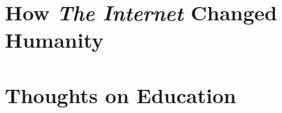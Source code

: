 \newpage


\toclineskip
\section{How \textit{The Internet} Changed Humanity}




\newpage


\toclineskip
\section{Thoughts on Education}


